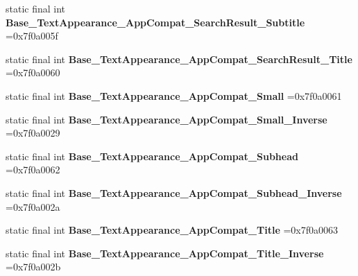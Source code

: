 \begin{DoxyCompactItemize}
\item 
\mbox{\label{classproject4_1_1xaria_1_1R_1_1style_aa9aa1ea064a5d98d341a7ffa84a42f9f}} 
static final int {\bfseries Base\+\_\+\+Text\+Appearance\+\_\+\+App\+Compat\+\_\+\+Search\+Result\+\_\+\+Subtitle} =0x7f0a005f
\item 
\mbox{\label{classproject4_1_1xaria_1_1R_1_1style_ad6ca31b7adcd6959868a65e8ddb8af6c}} 
static final int {\bfseries Base\+\_\+\+Text\+Appearance\+\_\+\+App\+Compat\+\_\+\+Search\+Result\+\_\+\+Title} =0x7f0a0060
\item 
\mbox{\label{classproject4_1_1xaria_1_1R_1_1style_afd2471d27973ae98708a669b086ff994}} 
static final int {\bfseries Base\+\_\+\+Text\+Appearance\+\_\+\+App\+Compat\+\_\+\+Small} =0x7f0a0061
\item 
\mbox{\label{classproject4_1_1xaria_1_1R_1_1style_a56e671bf37eb631eedcd788db6ea802d}} 
static final int {\bfseries Base\+\_\+\+Text\+Appearance\+\_\+\+App\+Compat\+\_\+\+Small\+\_\+\+Inverse} =0x7f0a0029
\item 
\mbox{\label{classproject4_1_1xaria_1_1R_1_1style_a5a3a115179e2d6b29e747405e541bee4}} 
static final int {\bfseries Base\+\_\+\+Text\+Appearance\+\_\+\+App\+Compat\+\_\+\+Subhead} =0x7f0a0062
\item 
\mbox{\label{classproject4_1_1xaria_1_1R_1_1style_a51b727497b3bf3852323e51d35eb5645}} 
static final int {\bfseries Base\+\_\+\+Text\+Appearance\+\_\+\+App\+Compat\+\_\+\+Subhead\+\_\+\+Inverse} =0x7f0a002a
\item 
\mbox{\label{classproject4_1_1xaria_1_1R_1_1style_a120e456cbd6485afd8344e2bdd89de46}} 
static final int {\bfseries Base\+\_\+\+Text\+Appearance\+\_\+\+App\+Compat\+\_\+\+Title} =0x7f0a0063
\item 
\mbox{\label{classproject4_1_1xaria_1_1R_1_1style_a6b0d1d494bc56476564bc97128b6b737}} 
static final int {\bfseries Base\+\_\+\+Text\+Appearance\+\_\+\+App\+Compat\+\_\+\+Title\+\_\+\+Inverse} =0x7f0a002b

\end{DoxyCompactItemize}
